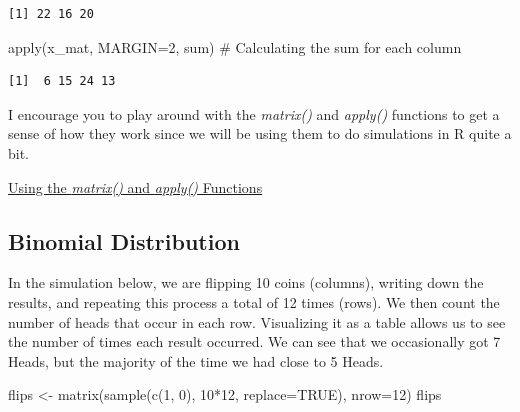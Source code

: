 \documentclass[
  letterpaper,
  DIV=11,
  numbers=noendperiod]{scrreprt}
\newenvironment{Shaded}{\begin{snugshade}}{\end{snugshade}}
\newcommand{\AttributeTok}[1]{\textcolor[rgb]{0.40,0.45,0.13}{#1}}
\newcommand{\CommentTok}[1]{\textcolor[rgb]{0.37,0.37,0.37}{#1}}
\newcommand{\ConstantTok}[1]{\textcolor[rgb]{0.56,0.35,0.01}{#1}}
\newcommand{\DecValTok}[1]{\textcolor[rgb]{0.68,0.00,0.00}{#1}}
\newcommand{\FunctionTok}[1]{\textcolor[rgb]{0.28,0.35,0.67}{#1}}
\newcommand{\NormalTok}[1]{\textcolor[rgb]{0.00,0.23,0.31}{#1}}
\newcommand{\OtherTok}[1]{\textcolor[rgb]{0.00,0.23,0.31}{#1}}
\newcommand{\SpecialCharTok}[1]{\textcolor[rgb]{0.37,0.37,0.37}{#1}}
\begin{document}
\begin{verbatim}
[1] 22 16 20
\end{verbatim}

\begin{Shaded}
\begin{Highlighting}[]
\FunctionTok{apply}\NormalTok{(x\_mat, }\AttributeTok{MARGIN=}\DecValTok{2}\NormalTok{, sum) }\CommentTok{\# Calculating the sum for each column}
\end{Highlighting}
\end{Shaded}

\begin{verbatim}
[1]  6 15 24 13
\end{verbatim}

I encourage you to play around with the \emph{matrix()} and
\emph{apply()} functions to get a sense of how they work since we will
be using them to do simulations in R quite a bit.

\begin{watch}{}{}
    \href{https://youtu.be/pc5_0-_KRuo}{Using the \textit{matrix()} and \textit{apply()} Functions}
\end{watch}

\subsection{Binomial Distribution}\label{binomial-distribution}

In the simulation below, we are flipping 10 coins (columns), writing
down the results, and repeating this process a total of 12 times (rows).
We then count the number of heads that occur in each row. Visualizing it
as a table allows us to see the number of times each result occurred. We
can see that we occasionally got 7 Heads, but the majority of the time
we had close to 5 Heads.

\begin{Shaded}
\begin{Highlighting}[]
\NormalTok{flips }\OtherTok{\textless{}{-}} \FunctionTok{matrix}\NormalTok{(}\FunctionTok{sample}\NormalTok{(}\FunctionTok{c}\NormalTok{(}\DecValTok{1}\NormalTok{, }\DecValTok{0}\NormalTok{), }\DecValTok{10}\SpecialCharTok{*}\DecValTok{12}\NormalTok{, }\AttributeTok{replace=}\ConstantTok{TRUE}\NormalTok{), }\AttributeTok{nrow=}\DecValTok{12}\NormalTok{)}
\NormalTok{flips}
\end{Highlighting}
\end{Shaded}
\end{document}
